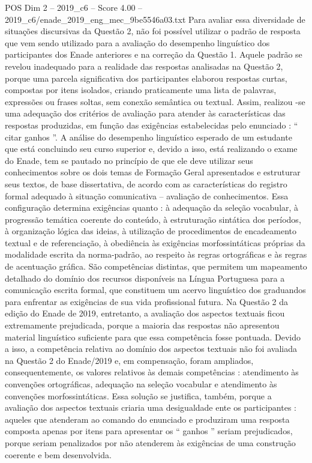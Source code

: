 \begin{textsample}{POS Dim 2 – 2019\_c6 – Score 4.00 – 2019\_c6/enade\_2019\_eng\_mec\_9be5546a03.txt}
Para avaliar essa diversidade de situações discursivas da Questão 2, não foi possível utilizar o padrão de resposta que vem sendo utilizado para a avaliação do desempenho linguístico dos participantes dos Enade anteriores e na correção da Questão 1.
Aquele padrão se revelou inadequado para a realidade das respostas analisadas na Questão 2, porque uma parcela significativa dos participantes elaborou respostas curtas, compostas por itens isolados, criando praticamente uma lista de palavras, expressões ou frases soltas, sem conexão semântica ou textual.
Assim, realizou -se uma adequação dos critérios de avaliação para atender às características das respostas produzidas, em função das exigências estabelecidas pelo enunciado : “ citar ganhos ”.
A análise do desempenho linguístico esperado de um estudante que está concluindo seu curso superior e, devido a isso, está realizando o exame do Enade, tem se pautado no princípio de que ele deve utilizar seus conhecimentos sobre os dois temas de Formação Geral apresentados e estruturar seus textos, de base dissertativa, de acordo com as características do registro formal adequado à situação comunicativa – avaliação de conhecimentos.
Essa configuração determina exigências quanto : à adequação da seleção vocabular, à progressão temática coerente do conteúdo, à estruturação sintática dos períodos, à organização lógica das ideias, à utilização de procedimentos de encadeamento textual e de referenciação, à obediência às exigências morfossintáticas próprias da modalidade escrita da norma-padrão, ao respeito às regras ortográficas e às regras de acentuação gráfica.
São competências distintas, que permitem um mapeamento detalhado do domínio dos recursos disponíveis na Língua Portuguesa para a comunicação escrita formal, que constituem um acervo linguístico dos graduandos para enfrentar as exigências de sua vida profissional futura.
Na Questão 2 da edição do Enade de 2019, entretanto, a avaliação dos aspectos textuais ficou extremamente prejudicada, porque a maioria das respostas não apresentou material linguístico suficiente para que essa competência fosse pontuada.
Devido a isso, a competência relativa ao domínio dos aspectos textuais não foi avaliada na Questão 2 do Enade/2019 e, em compensação, foram ampliados, consequentemente, os valores relativos às demais competências : atendimento às convenções ortográficas, adequação na seleção vocabular e atendimento às convenções morfossintáticas.
Essa solução se justifica, também, porque a avaliação dos aspectos textuais criaria uma desigualdade ente os participantes : aqueles que atenderam ao comando do enunciado e produziram uma resposta composta apenas por itens para apresentar os “ ganhos ” seriam prejudicados, porque seriam penalizados por não atenderem às exigências de uma construção coerente e bem desenvolvida.

\end{textsample}
